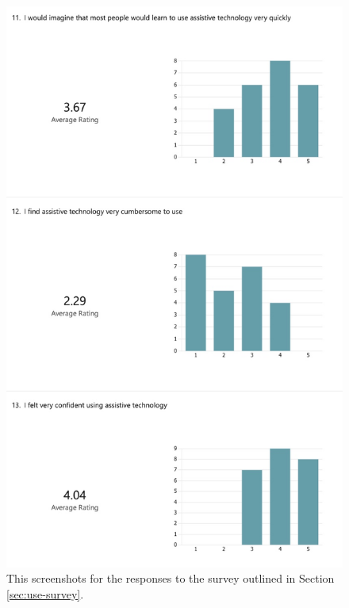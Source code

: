 \documentclass{l4proj}
\begin{document}
\begin{appendices}
\begin{figure}[H]
    \centering
    \includegraphics[width=0.75\linewidth]{dissertation/images/use-survey-4.jpeg}    
    \caption{This screenshots for the responses to the survey outlined in Section \ref{sec:use-survey}.}
    \label{fig:use-survey-4} 
\end{figure}


\end{appendices}
\end{document}
